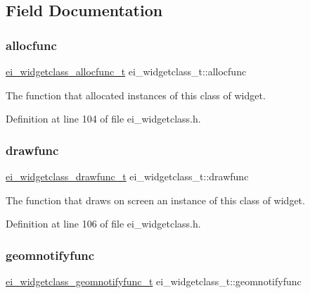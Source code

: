 \subsection{Field Documentation}
\mbox{\label{structei__widgetclass__t_a233446250cdde4347c1381427923d21a}} 
\subsubsection{\texorpdfstring{allocfunc}{allocfunc}}
{\footnotesize\ttfamily \hyperlink{ei__widgetclass_8h_a8bf36c46eca7fe4eb2657f674a87ef0b}{ei\+\_\+widgetclass\+\_\+allocfunc\+\_\+t} ei\+\_\+widgetclass\+\_\+t\+::allocfunc}



The function that allocated instances of this class of widget. 



Definition at line 104 of file ei\+\_\+widgetclass.\+h.

\mbox{\label{structei__widgetclass__t_a528168099a2a1515c4cf65400ccbfff2}} 
\subsubsection{\texorpdfstring{drawfunc}{drawfunc}}
{\footnotesize\ttfamily \hyperlink{ei__widgetclass_8h_a200aea6201a78fc8ec204791cfae6b47}{ei\+\_\+widgetclass\+\_\+drawfunc\+\_\+t} ei\+\_\+widgetclass\+\_\+t\+::drawfunc}



The function that draws on screen an instance of this class of widget. 



Definition at line 106 of file ei\+\_\+widgetclass.\+h.

\mbox{\label{structei__widgetclass__t_aaf0aa3f54a48a6b3f8b8e12574ede4b7}} 
\subsubsection{\texorpdfstring{geomnotifyfunc}{geomnotifyfunc}}
{\footnotesize\ttfamily \hyperlink{ei__widgetclass_8h_a61e618cc48a96d87fd3275530adc35e2}{ei\+\_\+widgetclass\+\_\+geomnotifyfunc\+\_\+t} ei\+\_\+widgetclass\+\_\+t\+::geomnotifyfunc}



